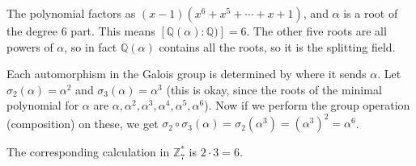 \documentclass[10pt]{exam}
\def\Z{\mathbb Z}
\def\Q{\mathbb Q}
\DeclareMathOperator{\Gal}{Gal}
\begin{document}
\begin{questions}
	\begin{solution}
		The polynomial factors as $(x-1)(x^6+x^5+\cdots + x + 1)$, and $\alpha$ is a root of the degree 6 part.  This means $[\Q(\alpha):\Q)] = 6$.  The other five roots are all powers of $\alpha$, so in fact $\Q(\alpha)$ contains all the roots, so it is the splitting field.

		Each automorphism in the Galois group is determined by where it sends $\alpha$.  Let $\sigma_2(\alpha) = \alpha^2$ and $\sigma_3(\alpha) = \alpha^3$ (this is okay, since the roots of the minimal polynomial for $\alpha$ are $\alpha, \alpha^2, \alpha^3, \alpha^4,\alpha^5,\alpha^6$).  Now if we perform the group operation (composition) on these, we get $\sigma_2\circ \sigma_3(\alpha) = \sigma_2(\alpha^3) = (\alpha^3)^2 = \alpha^6$.

		The corresponding calculation in $\Z_7^*$ is $2\cdot 3 = 6$.
	\end{solution}



		

\end{questions}
\end{document}
